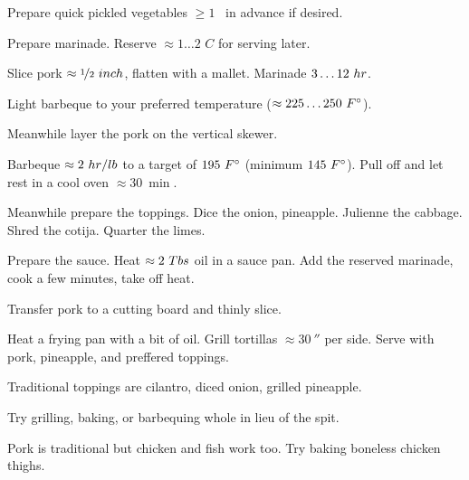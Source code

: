 \begin{preparation}
\item Prepare quick pickled vegetables $\ge 1$ \week~in advance if desired.

\item Prepare marinade.
	Reserve $\approx 1 \dots 2$ $C$ for serving later.

\item Slice pork $\approx \onehalf~\inch$, flatten with a mallet.
	Marinade $3 \dots 12~\hour$.

\item Light barbeque to your preferred temperature ($\approx 225 \dots 250~\Fahrenheit$).

\item Meanwhile layer the pork on the vertical skewer.

\item Barbeque $\approx 2~\hour / \pound$ to a target of $195~\Fahrenheit$ (minimum $145~\Fahrenheit$).
	Pull off and let rest in a cool oven $\approx 30~\min$.

\item Meanwhile prepare the toppings.
	Dice the onion, pineapple.
	Julienne the cabbage.
	Shred the cotija.
	Quarter the limes.

\item Prepare the sauce.
	Heat $\approx 2~\Tablespoon$ oil in a sauce pan.
	Add the reserved marinade, cook a few minutes, take off heat.

\item Transfer pork to a cutting board and thinly slice.

\item Heat a frying pan with a bit of oil.
	Grill tortillas $\approx 30~\second$ per side.
	Serve with pork, pineapple, and preffered toppings.
\end{preparation}


\begin{variation}
\item Traditional toppings are cilantro, diced onion, grilled pineapple.

\item Try grilling, baking, or barbequing whole in lieu of the spit.

\item Pork is traditional but chicken and fish work too.
	Try baking boneless chicken thighs.
\end{variation}


\recipeend%
